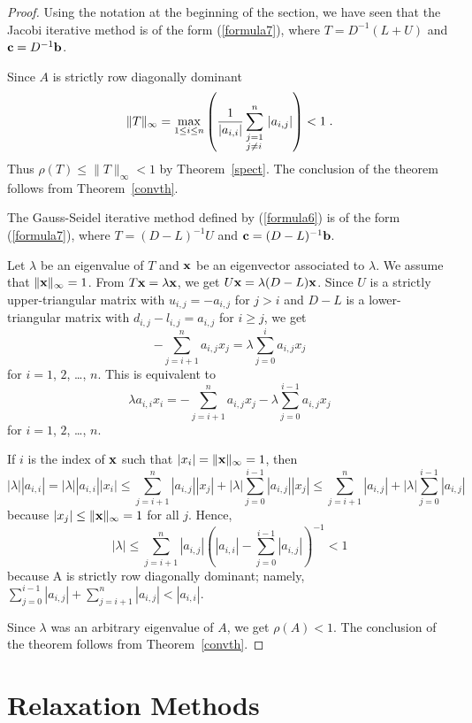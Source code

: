 \begin{proof}
  Using the notation at the beginning
of the section, we have seen that the Jacobi iterative method is of
the form (\ref{formula7}), where $T = D^{-1}(L + U)$ and
$\mathbf{c} = D^{-1}\mathbf{b}$.

Since $A$ is strictly row diagonally dominant
\[
\|T\|_\infty = \max_{1\leq i \leq n}\left( \frac{1}{|a_{i,i}|}
\sum_{\begin{subarray}{l} j=1 \\j \neq i \end{subarray}}^n \,
|a_{i,j}| \right) < 1 \; .
\]
Thus $\rho(T) \leq \|T \|_\infty < 1$ by Theorem~\ref{spect}.  The
conclusion of the theorem follows from Theorem~\ref{convth}.

The Gauss-Seidel iterative method defined by (\ref{formula6}) is of
the form (\ref{formula7}), where $T = (D-L)^{-1} U$ and
$\mathbf{c} = (D-L)^{-1}\mathbf{b}$.

Let $\lambda$ be an eigenvalue of $T$ and $\mathbf{x}$ be an eigenvector
associated to $\lambda$.  We assume that $\| \mathbf{x} \|_\infty = 1$.
From $T\mathbf{x} = \lambda \mathbf{x}$, we get
$U \mathbf{x} = \lambda (D-L)\mathbf{x}$.  Since $U$ is a strictly
upper-triangular matrix with $u_{i,j} = -a_{i,j}$ for $j>i$ and $D-L$ is a
lower-triangular matrix with $d_{i,j} - l_{i,j} = a_{i,j}$ for
$i\geq j$, we get
\[
-\sum_{j=i+1}^n a_{i,j} x_j= \lambda \sum_{j=0}^i a_{i,j} x_j
\]
for $i=1$, $2$, \ldots, $n$.
This is equivalent to
\[
\lambda a_{i,i} x_i = -\sum_{j=i+1}^n a_{i,j} x_j
- \lambda \sum_{j=0}^{i-1} a_{i,j} x_j
\]
for $i=1$, $2$, \ldots, $n$.

If $i$ is the index of $\mathbf{x}$ such that
$|x_i| = \|\mathbf{x}\|_\infty = 1$, then
\[
|\lambda| |a_{i,i}|
= |\lambda| |a_{i,i}| |x_i| \leq \sum_{j=i+1}^n |a_{i,j}| |x_j|
+ |\lambda| \sum_{j=0}^{i-1} |a_{i,j}| |x_j|
\leq \sum_{j=i+1}^n |a_{i,j}|
+ |\lambda| \sum_{j=0}^{i-1} |a_{i,j}|
\]
because $|x_j| \leq \|\mathbf{x}\|_\infty = 1$ for all $j$.  Hence,
\[
|\lambda| \leq \sum_{j=i+1}^n |a_{i,j}| \left(
|a_{i,i}| - \sum_{j=0}^{i-1} |a_{i,j}| \right)^{-1}
<1
\]
because A is strictly row diagonally dominant; namely,
$\displaystyle \sum_{j=0}^{i-1} |a_{i,j}| + \sum_{j=i+1}^n |a_{i,j}| <
|a_{i,i}|$.

Since $\lambda$ was an arbitrary eigenvalue of $A$, we get
$\rho(A)<1$.  The conclusion of the theorem follows from
Theorem~\ref{convth}.
\end{proof}

\section{Relaxation Methods}

